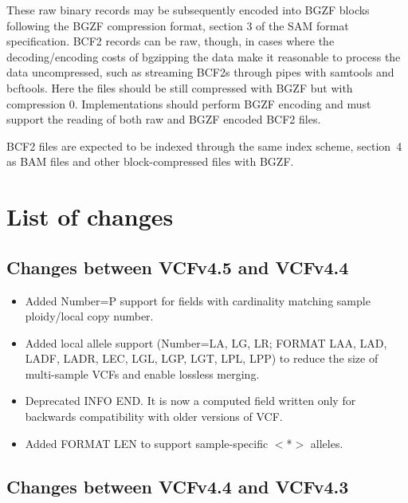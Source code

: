 \documentclass[8pt]{article}
\begin{document}
These raw binary records may be subsequently encoded into BGZF blocks following the BGZF compression format, section 3 of the SAM format specification.
BCF2 records can be raw, though, in cases where the decoding/encoding costs of bgzipping the data make it reasonable to process the data uncompressed, such as streaming BCF2s through pipes with samtools and bcftools.
Here the files should be still compressed with BGZF but with compression 0.
Implementations should perform BGZF encoding and must support the reading of both raw and BGZF encoded BCF2 files.

BCF2 files are expected to be indexed through the same index scheme, section~4 as BAM files and other block-compressed files with BGZF.

\section{List of changes}

\subsection{Changes between VCFv4.5 and VCFv4.4}

\begin{itemize}
	\item Added Number=P support for fields with cardinality matching sample ploidy/local copy number.
	\item Added local allele support (Number=LA, LG, LR; FORMAT LAA, LAD, LADF, LADR, LEC, LGL, LGP, LGT, LPL, LPP) to reduce the size of multi-sample VCFs and enable lossless merging.
	\item Deprecated INFO END. It is now a computed field written only for backwards compatibility with older versions of VCF.
	\item Added FORMAT LEN to support sample-specific $<$*$>$ alleles.
\end{itemize}

\subsection{Changes between VCFv4.4 and VCFv4.3}
\end{document}
